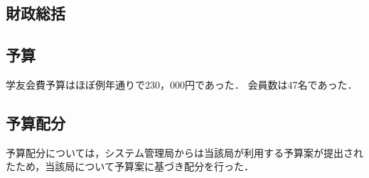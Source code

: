 \subsection*{財政総括}


\subsection*{予算}
学友会費予算はほぼ例年通りで230，000円であった．
会員数は47名であった．

\subsection*{予算配分}
予算配分については，システム管理局からは当該局が利用する予算案が提出されたため，当該局について予算案に基づき配分を行った．
